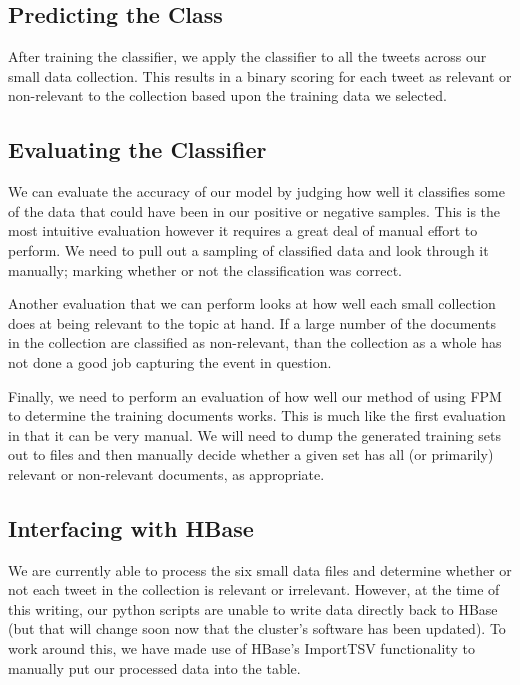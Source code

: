 \subsection{Predicting the Class}

After training the classifier, we apply the classifier to all the tweets across our small data collection. This results in a binary scoring for each tweet as relevant or non-relevant to the collection based upon the training data we selected.

\subsection{Evaluating the Classifier}

We can evaluate the accuracy of our model by judging how well it classifies some of the data that could have been in our positive or negative samples. This is the most intuitive evaluation however it requires a great deal of manual effort to perform. We need to pull out a sampling of classified data and look through it manually; marking whether or not the classification was correct.

Another evaluation that we can perform looks at how well each small collection does at being relevant to the topic at hand. If a large number of the documents in the collection are classified as non-relevant, than the collection as a whole has not done a good job capturing the event in question.

Finally, we need to perform an evaluation of how well our method of using FPM to determine the training documents works. This is much like the first evaluation in that it can be very manual. We will need to dump the generated training sets out to files and then manually decide whether a given set has all (or primarily) relevant or non-relevant documents, as appropriate.



\subsection{Interfacing with HBase}

We are currently able to process the six small data files and determine whether or not each tweet in the collection is relevant or irrelevant. However, at the time of this writing, our python scripts are unable to write data directly back to HBase (but that will change soon now that the cluster's software has been updated). To work around this, we have made use of HBase's ImportTSV functionality to manually put our processed data into the table.


